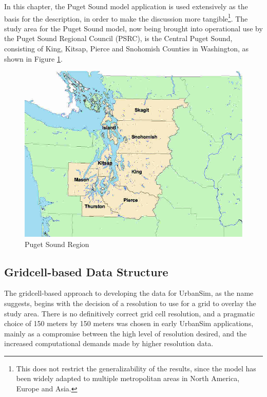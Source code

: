 In this chapter, the Puget Sound model application is used extensively as the basis for the description, in order to make the discussion more tangible\footnote{This does not restrict the generalizability of the results, since the model has been widely adapted to multiple metropolitan areas in North America, Europe and Asia.}.  The study area for the Puget Sound model, now being brought into operational use by the Puget Sound Regional Council (PSRC), is the Central Puget Sound, consisting of King, Kitsap, Pierce and Snohomish Counties in Washington, as shown in Figure \ref{fig:puget-sound}.

\begin{figure}
\begin{center} 
\includegraphics[scale=0.4]{graphics/psrc-p1.jpg}
\end{center}
\caption{Puget Sound Region} 
\label{fig:puget-sound}
\end{figure}

\subsection{Gridcell-based Data Structure}

The gridcell-based approach to developing the data for UrbanSim, as the name suggests, begins with the decision of a resolution to use for a grid to overlay the study area.  There is no definitively correct grid cell resolution, and a pragmatic choice of 150 meters by 150 meters was chosen in early UrbanSim
applications, mainly as a compromise between the high level of resolution desired, and the increased computational demands made by higher resolution data.

